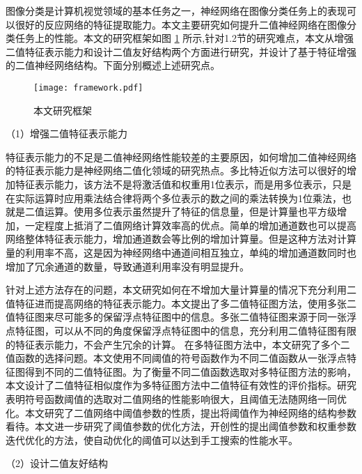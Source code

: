 图像分类是计算机视觉领域的基本任务之一，神经网络在图像分类任务上的表现可以很好的反应网络的特征提取能力。本文主要研究如何提升二值神经网络在图像分类任务上的性能。本文的研究框架如图 \ref{fig:framework} 所示,针对1.2节的研究难点，本文从增强二值特征表示能力和设计二值友好结构两个方面进行研究，并设计了基于特征增强的二值神经网络结构。下面分别概述上述研究点。

\begin{figure}[htb]
  \vspace{6pt}
  \centering
  \texttt{[image: framework.pdf]}
  \caption{本文研究框架}
  \label{fig:framework}
\end{figure}

（1）增强二值特征表示能力

特征表示能力的不足是二值神经网络性能较差的主要原因，如何增加二值神经网络的特征表示能力是神经网络二值化领域的研究热点。多比特近似方法\citep{abcnet}可以很好的增加特征表示能力，该方法不是将激活值和权重用1位表示，而是用多位表示，只是在实际运算时应用乘法结合律将两个多位表示的数之间的乘法转换为1位乘法，也就是二值运算。使用多位表示虽然提升了特征的信息量，但是计算量也平方级增加，一定程度上抵消了二值网络计算效率高的优点。简单的增加通道数\cite{meliusnet}也可以提高网络整体特征表示能力，增加通道数会等比例的增加计算量。但是这种方法对计算量的利用率不高，这是因为神经网络中通道间相互独立，单纯的增加通道数同时也增加了冗余通道的数量，导致通道利用率没有明显提升。

针对上述方法存在的问题，本文研究如何在不增加大量计算量的情况下充分利用二值特征进而提高网络的特征表示能力。本文提出了多二值特征图方法，使用多张二值特征图来尽可能多的保留浮点特征图中的信息。多张二值特征图来源于同一张浮点特征图，可以从不同的角度保留浮点特征图中的信息，充分利用二值特征图有限的特征表示能力，不会产生冗余的计算。
在多特征图方法中，本文研究了多个二值函数的选择问题。本文使用不同阈值的符号函数作为不同二值函数从一张浮点特征图得到不同的二值特征图。为了衡量不同二值函数选取对多特征图方法的影响，本文设计了二值特征相似度作为多特征图方法中二值特征有效性的评价指标。研究\cite{unbalance}表明符号函数阈值的选取对二值网络的性能影响很大，且阈值无法随网络一同优化。本文研究了二值网络中阈值参数的性质，提出将阈值作为神经网络的结构参数看待。本文进一步研究了阈值参数的优化方法，开创性的提出阈值参数和权重参数迭代优化的方法，使自动优化的阈值可以达到手工搜索的性能水平。

（2）设计二值友好结构

